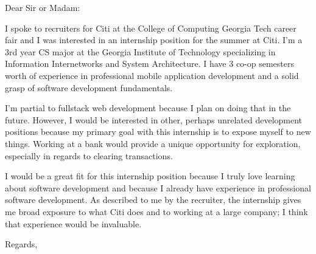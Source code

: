\documentclass{letter}
\begin{document}
\begin{letter}{}
\opening{Dear Sir or Madam:}

I spoke to recruiters for Citi at the College of Computing Georgia Tech career fair and I was interested in an internship position for the summer at Citi. I'm a 3rd year CS major at the Georgia Institute of Technology specializing in Information Internetworks and System Architecture. I have 3 co-op semesters worth of experience in professional mobile application development and a solid grasp of software development fundamentals. 

I'm partial to fullstack web development because I plan on doing that in the future. However, I would be interested in other, perhaps unrelated development positions because my primary goal with this internship is to expose myself to new things. Working at a bank would provide a unique opportunity for exploration, especially in regards to clearing transactions.

I would be a great fit for this internship position because I truly love learning about software development and because I already have experience in professional software development.  As described to me by the recruiter, the internship gives me broad exposure to what Citi does and to working at a large company; I think that experience would be invaluable.


\closing{Regards,}
\end{letter}
\end{document}
